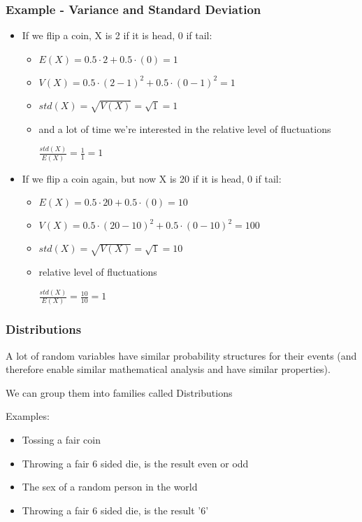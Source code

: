 \documentclass{beamer}
\begin{document}
\begin{frame}
\frametitle{Example - Variance and Standard Deviation}
\begin{itemize}
\item If we flip a coin, X is 2 if it is head, 0 if tail:
\begin{itemize}
\item $E(X)=0.5 \cdot 2 + 0.5 \cdot (0)=1$
\item $V(X)=0.5 \cdot (2-1)^2 + 0.5 \cdot (0-1)^2=1$
\item $std(X)=\sqrt{V(X)}=\sqrt{1}=1$
\item and a lot of time we're interested in the relative level of fluctuations

$\frac{std(X)}{E(X)}=\frac{1}{1}=1$
\end{itemize}
\item If we flip a coin again, but now X is 20 if it is head, 0 if tail:
\begin{itemize}
\item $E(X)=0.5 \cdot 20 + 0.5 \cdot (0)=10$
\item $V(X)=0.5 \cdot (20-10)^2 + 0.5 \cdot (0-10)^2=100$
\item $std(X)=\sqrt{V(X)}=\sqrt{1}=10$
\item relative level of fluctuations

$\frac{std(X)}{E(X)}=\frac{10}{10}=1$
\end{itemize}
\end{itemize}
\end{frame}


\begin{frame}
\frametitle{Distributions}
A lot of random variables have similar probability structures for their events (and therefore enable similar mathematical analysis and have similar properties).

We can group them into families called Distributions

Examples:
\begin{itemize}
\item Tossing a fair coin
\item Throwing a fair 6 sided die, is the result even or odd
\item The sex of a random person in the world
\item Throwing a fair 6 sided die, is the result '6'
\end{itemize}
\end{frame}
\end{document}
